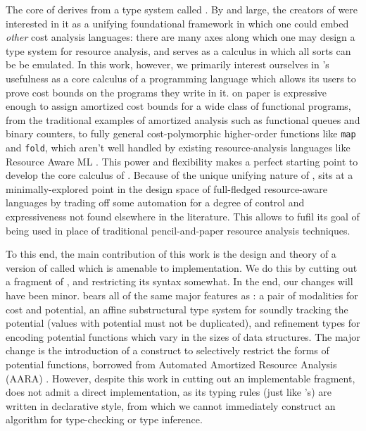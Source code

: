 The core of \lambdaamorimpl derives from a type system called \lambdaamor \cite{rajani-et-al:popl21}. By and large, the creators of \lambdaamor were interested in it as a unifying foundational framework in which one could embed \textit{other} cost analysis languages: there are many axes along which one may design a type system for resource analysis, and \lambdaamor serves as a calculus in which all sorts can be be emulated. In this work, however, we primarily interest ourselves in \lambdaamor's usefulness as a core calculus of a programming language which allows its users to prove cost bounds on the programs they write in it. \lambdaamor on paper is expressive enough to assign amortized cost bounds for a wide class of functional programs, from the traditional examples of amortized analysis such as functional queues and binary counters, to fully general cost-polymorphic higher-order functions like \texttt{map} and \texttt{fold}, which aren't well handled by existing resource-analysis languages like Resource Aware ML \cite{hoffmann-et-al:cav12}. This power and flexibility makes \lambdaamor a perfect starting point to develop the core calculus of \lambdaamorimpl. Because of the unique unifying nature of \lambdaamor, \lambdaamorimpl sits at a minimally-explored point in the design space of full-fledged resource-aware languages by trading off some automation for a degree of control and expressiveness not found elsewhere in the literature. This allows \lambdaamorimpl to fufil its goal of being used in place of traditional pencil-and-paper resource analysis techniques. 

To this end, the main contribution of this work is the design and theory of a version of \lambdaamor called \dlambdaamor which is amenable to implementation. We do this by cutting out a fragment of \lambdaamor, and restricting its syntax somewhat. In the end, our changes will have been minor. \dlambdaamor bears all of the same major features as \lambdaamor: a pair of modalities for cost and potential, an affine substructural type system for soundly tracking the potential (values with potential must not be duplicated), and refinement types for encoding potential functions which vary in the sizes of data structures. The major change is the introduction of a construct to selectively restrict the forms of potential functions, borrowed from Automated Amortized Resource Analysis (AARA) \cite{hoffmann-et-al:esop10}. However, despite this work in cutting out an implementable fragment, \dlambdaamor does not admit a direct implementation, as its typing rules (just like \lambdaamor's) are written in declarative style, from which we cannot immediately construct an algorithm for type-checking or type inference. 


